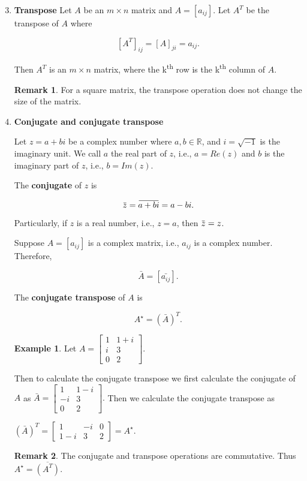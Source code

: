 \documentclass[12pt]{article}
\newcommand{\overbar}[1]{\mkern 1.5mu\overline{\mkern-1.5mu#1\mkern-1.5mu}\mkern 1.5mu}
\theoremstyle{definition}
\newtheorem*{example}{Example}
\newtheorem*{remark}{Remark}
\begin{document}
\begin{enumerate}
\setcounter{enumi}{2}
\item \textbf{Transpose} Let $A$ be an $m \times n$ matrix and $A = [a_{ij}]$. Let $A^T$
be the transpose of $A$ where

\[
\left[ A^T \right]_{ij} = \left[ A \right]_{ji} = a_{ij}.
\]

Then $A^T$ is an $m \times n$ matrix, where the k\textsuperscript{th} row is the
k\textsuperscript{th} column of $A$.

\begin{remark}
For a square matrix, the transpose operation does not change the size of the matrix.
\end{remark}

\item \textbf{Conjugate and conjugate transpose}

Let $z = a + bi$ be a complex number where $a, b \in \mathbb{R}$, and $i = \sqrt{-1}$ is
the imaginary unit. We call $a$ the real part of $z$, i.e., $a = Re(z)$ and $b$ is
the imaginary part of $z$, i.e., $b = Im(z)$.

The \textbf{conjugate} of $z$ is

\[
\overbar{z} = \overbar{a + bi} = a - bi.
\]

Particularly, if $z$ is a real number, i.e., $z = a$, then $\overbar{z} = z$.

Suppose $A = [a_{ij}]$ is a complex matrix, i.e., $a_{ij}$ is a complex number. Therefore,

$$ \bar{A} = \left[ \bar{a_{ij}} \right]. $$


The \textbf{conjugate transpose} of $A$ is 

$$ A^{\star} = ( \bar{A} )^T. $$


\begin{example}
Let 
$ A =
\begin{bmatrix}
1 & 1 + i \\
i & 3 \\
0 & 2
\end{bmatrix}.
$

Then to calculate the conjugate transpose we first calculate the conjugate of $A$ as
$
\bar{A} =
\begin{bmatrix}
1 & 1 - i \\
-i & 3 \\
0 & 2
\end{bmatrix}.
$
Then we calculate the conjugate transpose as

$
(\bar{A})^T =
\begin{bmatrix}
1 & -i & 0 \\
1-i & 3 & 2
\end{bmatrix}
= A^{\star}
$.

\begin{remark}
The conjugate and transpose operations are commutative. Thus
$A^{\star} = \overline{(A^T)}$.
\end{remark}

\end{example}

\end{enumerate}
\end{document}
